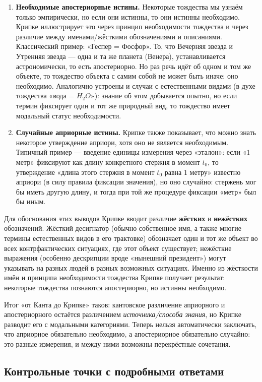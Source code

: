 \documentclass[a4paper,12pt]{article}
\begin{document}
\begin{enumerate}
    \item \textbf{Необходимые апостериорные истины.} Некоторые тождества мы узнаём только эмпирически, но если они истинны, то они истинны необходимо. Крипке иллюстрирует это через принцип необходимости тождества и через различие между именами/жёсткими обозначениями и описаниями. Классический пример: «Геспер = Фосфор». То, что Вечерняя звезда и Утренняя звезда --- одна и та же планета (Венера), устанавливается астрономически, то есть апостериорно. Но раз речь идёт об одном и том же объекте, то тождество объекта с самим собой не может быть иначе: оно необходимо. Аналогично устроены и случаи с естественными видами (в духе тождества «вода = $H_2O$»): знание об этом добывается опытно, но если термин фиксирует один и тот же природный вид, то тождество имеет модальный статус необходимости.
    \item \textbf{Случайные априорные истины.} Крипке также показывает, что можно знать некоторое утверждение априори, хотя оно не является необходимым. Типичный пример --- введение единицы измерения через «эталон»: если «$1$ метр» фиксируют как длину конкретного стержня в момент $t_0$, то утверждение «длина этого стержня в момент $t_0$ равна $1$ метру» известно априори (в силу правила фиксации значения), но оно случайно: стержень мог бы иметь другую длину, и тогда при той же процедуре фиксации «метр» был бы иным.
\end{enumerate}

Для обоснования этих выводов Крипке вводит различие \textbf{жёстких} и \textbf{нежёстких} обозначений. Жёсткий десигнатор (обычно собственное имя, а также многие термины естественных видов в его трактовке) обозначает один и тот же объект во всех контрфактических ситуациях, где этот объект существует; нежёсткие выражения (особенно дескрипции вроде «нынешний президент») могут указывать на разных людей в разных возможных ситуациях. Именно из жёсткости имён и принципа необходимости тождества Крипке получает результат: некоторые тождества познаются апостериорно, но истинны необходимо.

Итог «от Канта до Крипке» таков: кантовское различение априорного и апостериорного остаётся различением \emph{источника/способа знания}, но Крипке разводит его с модальными категориями. Теперь нельзя автоматически заключать, что априорное обязательно необходимо, а апостериорное обязательно случайно: это разные измерения, и между ними возможны перекрёстные сочетания.

\subsection{Контрольные точки с подробными ответами}
\end{document}
